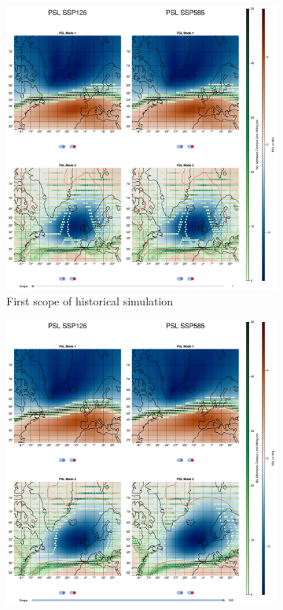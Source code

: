 \begin{figure}[!thbp]
\centering 
  \begin{subfigure}[b]{.49\textwidth}
        \includegraphics[width=\textwidth]{figures/psl_eof_2modes_historical.png}
    \caption{First scope of historical simulation}
    \label{fig:psl spatial patterns historical}
  \end{subfigure}
  \hfill
  \begin{subfigure}[b]{.49\textwidth}
        \includegraphics[width=\textwidth]{figures/psl_eof_2modes_endscenario.png}

\end{subfigure}
\end{figure}
